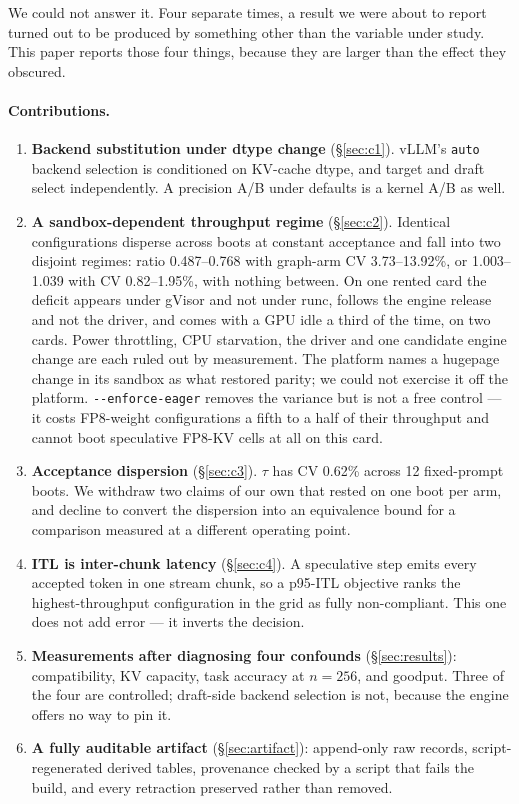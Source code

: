 \documentclass[11pt]{article}
\newcommand{\tw}[1]{\texttt{\small #1}}
\begin{document}
We could not answer it. Four separate times, a result we were about to
report turned out to be produced by something other than the variable under
study. This paper reports those four things, because they are larger than
the effect they obscured.

\paragraph{Contributions.}
\begin{enumerate}\itemsep2pt
\item \textbf{Backend substitution under dtype change} (\S\ref{sec:c1}).
vLLM's \tw{auto} backend selection is conditioned on KV-cache dtype, and
target and draft select independently. A precision A/B under defaults is a
kernel A/B as well.
\item \textbf{A sandbox-dependent throughput regime} (\S\ref{sec:c2}).
Identical configurations disperse across boots at constant acceptance and
fall into two disjoint regimes: ratio 0.487--0.768 with graph-arm CV
3.73--13.92\%, or 1.003--1.039 with CV 0.82--1.95\%, with nothing between.
On one rented card the deficit appears under gVisor and not under runc,
follows the engine release and not the driver, and comes with a GPU idle a
third of the time, on two cards. Power throttling, CPU starvation, the driver
and one candidate engine change are each ruled out by measurement. The
platform names a hugepage change in its sandbox as what restored parity; we
could not exercise it off the platform. \tw{-{}-enforce-eager} removes the
variance but is not a free control --- it costs FP8-weight configurations
a fifth to a half of their throughput and cannot boot speculative FP8-KV
cells at all on this card.
\item \textbf{Acceptance dispersion} (\S\ref{sec:c3}). $\tau$ has CV
0.62\% across 12 fixed-prompt boots. We withdraw two claims of our own that
rested on one boot per arm, and decline to convert the dispersion into an
equivalence bound for a comparison measured at a different operating
point.
\item \textbf{ITL is inter-chunk latency} (\S\ref{sec:c4}). A speculative
step emits every accepted token in one stream chunk, so a p95-ITL objective
ranks the highest-throughput configuration in the grid as fully
non-compliant. This one does not add error --- it inverts the decision.
\item \textbf{Measurements after diagnosing four confounds}
(\S\ref{sec:results}): compatibility, KV capacity, task accuracy at
$n{=}256$, and goodput. Three of the four are controlled; draft-side
backend selection is not, because the engine offers no way to pin it.
\item \textbf{A fully auditable artifact} (\S\ref{sec:artifact}):
append-only raw records, script-regenerated derived tables, provenance
checked by a script that fails the build, and every retraction preserved
rather than removed.
\end{enumerate}
\end{document}
